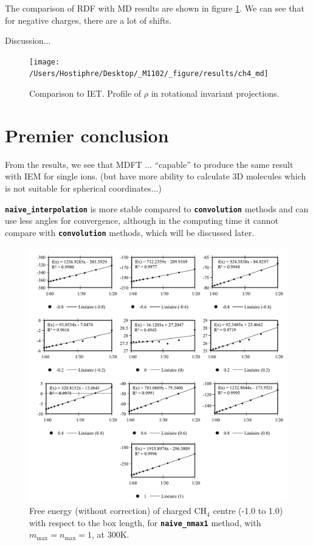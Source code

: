 The comparison of RDF with MD results are shown in figure \ref{fig:Comparison-to-MD}.
We can see that for negative charges, there are a lot of shifts.

Discussion...

\begin{figure}[H]
\begin{centering}
\texttt{[image: /Users/Hostiphre/Desktop/\_M1102/\_figure/results/ch4\_md]}
\par\end{centering}
\caption{Comparison to IET. Profile of $\rho$ in rotational invariant projections.\label{fig:Comparison-to-MD}}
\end{figure}


\section{Premier conclusion}

From the results, we see that MDFT ... ``capable'' to produce the
same result with IEM for single ions. (but have more ability to calculate
3D molecules which is not suitable for spherical coordinates...)

\texttt{\textbf{naive\_interpolation}} is more stable compared to
\texttt{\textbf{convolution}} methods and can use less angles for
convergence, although in the computing time it cannot compare with
\texttt{\textbf{convolution}} methods, which will be discussed later.

\begin{figure}[h]
\begin{centering}
\includegraphics[width=0.95\columnwidth]{_figure/results/ch4_nmax1_lmn}
\par\end{centering}
\caption{Free energy (without correction) of charged $\mathrm{C}\mathrm{H}_{4}$
centre (-1.0 to 1.0) with respect to the box length, for \texttt{\textbf{naive\_nmax1}}
method, with $m_{\max}=n_{\max}=1$, at 300K.\label{fig:ch4_nmax1_lmn}}
\end{figure}

